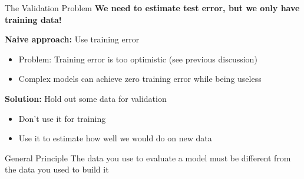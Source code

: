 \documentclass[10pt]{beamer}
\begin{document}
\begin{frame}{The Validation Problem}
  \textbf{We need to estimate test error, but we only have training data!}
  
  \vspace{0.5em}
  \textbf{Naive approach:} Use training error
  \begin{itemize}
    \item Problem: Training error is too optimistic (see previous discussion)
    \item Complex models can achieve zero training error while being useless
  \end{itemize}
  
  \vspace{0.5em}
  \textbf{Solution:} Hold out some data for validation
  \begin{itemize}
    \item Don't use it for training
    \item Use it to estimate how well we would do on new data
  \end{itemize}
  
  \vspace{0.5em}
  \begin{block}{General Principle}
    The data you use to evaluate a model must be different from the data you used to build it
  \end{block}
\end{frame}
\end{document}
